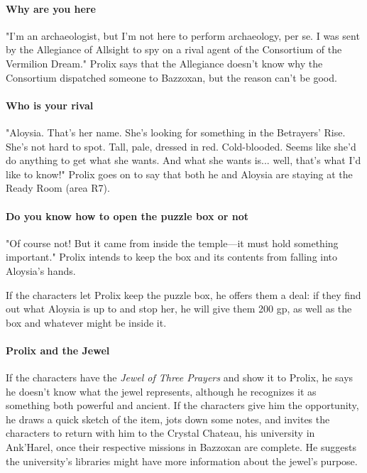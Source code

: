 \documentclass[letterpaper, 11pt, bg=full, twocolumn]{dndbook}
\begin{document}
\paragraph{Why are you here}

"I'm an archaeologist, but I'm not here to perform archaeology, per se. I was sent by the Allegiance of Allsight to spy on a rival agent of the Consortium of the Vermilion Dream." Prolix says that the Allegiance doesn't know why the Consortium dispatched someone to Bazzoxan, but the reason can't be good.

\paragraph{Who is your rival}

"Aloysia. That's her name. She's looking for something in the Betrayers' Rise. She's not hard to spot. Tall, pale, dressed in red. Cold-blooded. Seems like she'd do anything to get what she wants. And what she wants is... well, that's what I'd like to know!" Prolix goes on to say that both he and Aloysia are staying at the Ready Room (area R7).

\paragraph{Do you know how to open the puzzle box or not}

"Of course not! But it came from inside the temple---it must hold something important." Prolix intends to keep the box and its contents from falling into Aloysia's hands.

If the characters let Prolix keep the puzzle box, he offers them a deal: if they find out what Aloysia is up to and stop her, he will give them 200 gp, as well as the box and whatever might be inside it.

\paragraph{Prolix and the Jewel}

If the characters have the \textit{Jewel of Three Prayers} and show it to Prolix, he says he doesn't know what the jewel represents, although he recognizes it as something both powerful and ancient. If the characters give him the opportunity, he draws a quick sketch of the item, jots down some notes, and invites the characters to return with him to the Crystal Chateau, his university in Ank'Harel, once their respective missions in Bazzoxan are complete. He suggests the university's libraries might have more information about the jewel's purpose.
\end{document}
